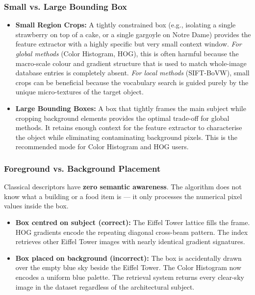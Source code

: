 \documentclass[11pt, a4paper]{article}
\begin{document}
\subsubsection{Small vs. Large Bounding Box}
\begin{itemize}
  \item \textbf{Small Region Crops:} A tightly constrained box (e.g., isolating a single strawberry on top of a cake, or a single gargoyle on Notre Dame) provides the feature extractor with a highly specific but very small context window. \textit{For global methods} (Color Histogram, HOG), this is often harmful because the macro-scale colour and gradient structure that is used to match whole-image database entries is completely absent. \textit{For local methods} (SIFT-BoVW), small crops can be beneficial because the vocabulary search is guided purely by the unique micro-textures of the target object.
  \item \textbf{Large Bounding Boxes:} A box that tightly frames the main subject while cropping background elements provides the optimal trade-off for global methods. It retains enough context for the feature extractor to characterise the object while eliminating contaminating background pixels. This is the recommended mode for Color Histogram and HOG users.
\end{itemize}

\subsubsection{Foreground vs. Background Placement}
Classical descriptors have \textbf{zero semantic awareness}. The algorithm does not know what a building or a food item is — it only processes the numerical pixel values inside the box.

\begin{itemize}
  \item \textbf{Box centred on subject (correct):} The Eiffel Tower lattice fills the frame. HOG gradients encode the repeating diagonal cross-beam pattern. The index retrieves other Eiffel Tower images with nearly identical gradient signatures.
  \item \textbf{Box placed on background (incorrect):} The box is accidentally drawn over the empty blue sky beside the Eiffel Tower. The Color Histogram now encodes a uniform blue palette. The retrieval system returns every clear-sky image in the dataset regardless of the architectural subject.
\end{itemize}
\end{document}
